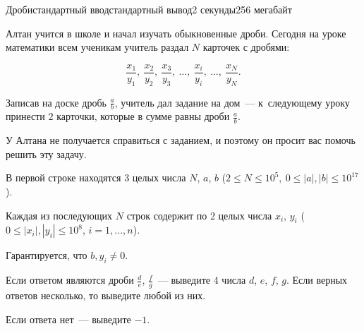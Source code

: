 \begin{problem}{Дроби}{стандартный ввод}{стандартный вывод}{2 секунды}{256 мегабайт}

Алтан учится в школе и начал изучать обыкновенные дроби. Сегодня на уроке математики всем ученикам учитель раздал $N$ карточек с дробями: 

$$ \frac{x_1}{y_1},\: \frac{x_2}{y_2},\: \frac{x_3}{y_3},\: \dots,\: \frac{x_i}{y_i},\: \dots,\: \frac{x_N}{y_N}.$$

Записав на доске дробь $\displaystyle \frac{a}{b}$, учитель дал задание на дом~--- к~следующему уроку принести 2 карточки, которые в сумме равны дроби $\displaystyle \frac{a}{b}$.

У Алтана не получается справиться с заданием, и поэтому он просит вас помочь решить эту задачу.

\InputFile
В первой строке находятся 3 целых числа $N$, $a$, $b$ ($2 \leq N \leq 10^5,\: 0 \leq \left|a\right|, \left|b\right| \leq 10^{17}$).

Каждая из последующих $N$ строк содержит по 2 целых числа $x_i$, $y_i$ ($0 \leq \left|x_i\right|, \left|y_i\right| \leq 10^8$, $i=1, \dots, n$).

Гарантируется, что $b, y_i \neq 0$.

\OutputFile
Если ответом являются дроби $\displaystyle \frac{d}{e}$, $\displaystyle \frac{f}{g}$~--- выведите 4 числа $d$, $e$, $f$, $g$. Если верных ответов несколько, то выведите любой из них.

Если ответа нет~--- выведите $-1$.

\Example

\begin{example}
%
\end{example}

\end{problem}

